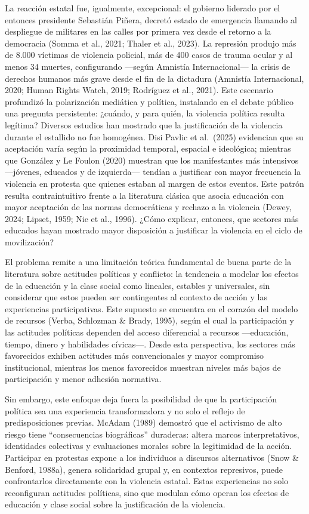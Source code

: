 \documentclass[
  13pt,
]{article}
\begin{document}
La reacción estatal fue, igualmente, excepcional: el gobierno liderado
por el entonces presidente Sebastián Piñera, decretó estado de
emergencia llamando al despliegue de militares en las calles por primera
vez desde el retorno a la democracia (Somma et al., 2021; Thaler et al.,
2023). La represión produjo más de 8.000 víctimas de violencia policial,
más de 400 casos de trauma ocular y al menos 34 muertes, configurando
---según Amnistía Internacional--- la crisis de derechos humanos más
grave desde el fin de la dictadura (Amnistía Internacional, 2020; Human
Rights Watch, 2019; Rodríguez et al., 2021). Este escenario profundizó
la polarización mediática y política, instalando en el debate público
una pregunta persistente: ¿cuándo, y para quién, la violencia política
resulta legítima? Diversos estudios han mostrado que la justificación de
la violencia durante el estallido no fue homogénea. Disi Pavlic et
al.~(2025) evidencian que su aceptación varía según la proximidad
temporal, espacial e ideológica; mientras que González y Le Foulon
(2020) muestran que los manifestantes más intensivos ---jóvenes,
educados y de izquierda--- tendían a justificar con mayor frecuencia la
violencia en protesta que quienes estaban al margen de estos eventos.
Este patrón resulta contraintuitivo frente a la literatura clásica que
asocia educación con mayor aceptación de las normas democráticas y
rechazo a la violencia (Dewey, 2024; Lipset, 1959; Nie et al., 1996).
¿Cómo explicar, entonces, que sectores más educados hayan mostrado mayor
disposición a justificar la violencia en el ciclo de movilización?

El problema remite a una limitación teórica fundamental de buena parte
de la literatura sobre actitudes políticas y conflicto: la tendencia a
modelar los efectos de la educación y la clase social como lineales,
estables y universales, sin considerar que estos pueden ser contingentes
al contexto de acción y las experiencias participativas. Este supuesto
se encuentra en el corazón del modelo de recursos (Verba, Schlozman \&
Brady, 1995), según el cual la participación y las actitudes políticas
dependen del acceso diferencial a recursos ---educación, tiempo, dinero
y habilidades cívicas---. Desde esta perspectiva, los sectores más
favorecidos exhiben actitudes más convencionales y mayor compromiso
institucional, mientras los menos favorecidos muestran niveles más bajos
de participación y menor adhesión normativa.

Sin embargo, este enfoque deja fuera la posibilidad de que la
participación política sea una experiencia transformadora y no solo el
reflejo de predisposiciones previas. McAdam (1989) demostró que el
activismo de alto riesgo tiene ``consecuencias biográficas'' duraderas:
altera marcos interpretativos, identidades colectivas y evaluaciones
morales sobre la legitimidad de la acción. Participar en protestas
expone a los individuos a discursos alternativos (Snow \& Benford,
1988a), genera solidaridad grupal y, en contextos represivos, puede
confrontarlos directamente con la violencia estatal. Estas experiencias
no solo reconfiguran actitudes políticas, sino que modulan cómo operan
los efectos de educación y clase social sobre la justificación de la
violencia.
\end{document}
